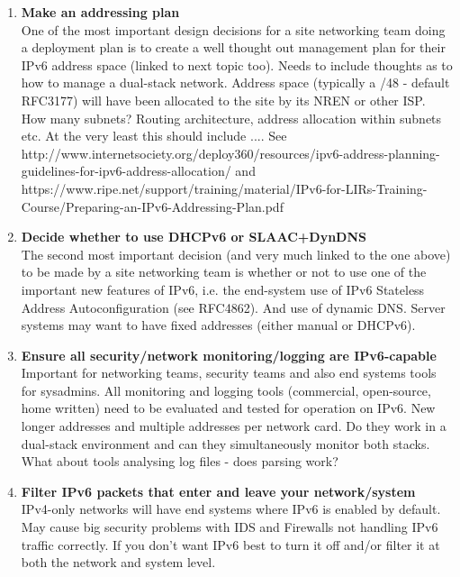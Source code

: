 




\begin{enumerate}


\item {\bf Make an addressing plan}\\
One of the most important design decisions for a site networking team doing a deployment plan is to create a well thought out management plan for their IPv6 address space (linked to next topic too). Needs to include thoughts as to how to manage a dual-stack network. Address space (typically a /48 - default RFC3177) will have been allocated to the site by its NREN or other ISP. How many subnets? Routing architecture, address allocation within subnets etc. At the very least this should include .... See http://www.internetsociety.org/deploy360/resources/ipv6-address-planning-guidelines-for-ipv6-address-allocation/   and https://www.ripe.net/support/training/material/IPv6-for-LIRs-Training-Course/Preparing-an-IPv6-Addressing-Plan.pdf  


\item {\bf Decide whether to use DHCPv6 or SLAAC+DynDNS} \\
The second most important decision (and very much linked to the one above) to be made by a site networking team is whether or not to use one of the important new features of IPv6, i.e. the end-system use of  IPv6 Stateless Address Autoconfiguration (see RFC4862).  And use of dynamic DNS.  Server systems may want to have fixed addresses (either manual or DHCPv6).



\item {\bf Ensure all security/network monitoring/logging are IPv6-capable}\\
Important for networking teams, security teams and also end systems tools for sysadmins. All monitoring and logging tools (commercial, open-source, home written) need to be evaluated and tested for operation on IPv6. New longer addresses and multiple addresses per network card. Do they work in a dual-stack environment and can they simultaneously monitor both stacks.  What about tools analysing log files - does parsing work?


\item {\bf Filter IPv6 packets that enter and leave your network/system}\\
IPv4-only networks will have end systems where IPv6 is enabled by default. May cause big security problems with IDS and Firewalls not handling IPv6 traffic correctly. If you don't want IPv6 best to turn it off and/or filter it at both the network and system level.


\end{enumerate}
